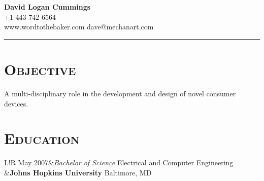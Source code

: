 \documentclass[10pt, letterpaper]{article}
\newcommand\VRule{\color{lightgray}\vrule width 0.5pt}
\begin{document}
\hfill {\Large\bf{David Logan Cummings}} \\
\hfill +1-443-742-6564 \\
www.wordtothebaker.com \hfill dave@mechanart.com
\vspace{1em}
\hrule height 1pt


\section*{\textsc{\textbf{Objective}}} A multi-disciplinary role in the development and design of novel
consumer devices. 


\section*{\textbf{\textsc{Education}}} 
\begin{tabular}{L!{\VRule}R}
  May 2007&{\sl Bachelor of Science}  \hfill Electrical and Computer Engineering \\
          &\textbf{Johns Hopkins University}  \hfill Baltimore, MD \\
\end{tabular}
\end{document}
